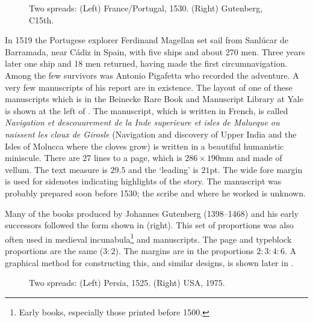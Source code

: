 \documentclass[10pt,letterpaper]{memoir}
\newlength{\pwlayi}\setlength{\pwlayi}{0.45\textwidth} %
\newlength{\pwlayii}\setlength{\pwlayii}{0.45\pwlayi}
\begin{document}
\begin{figure}
\centering
\begin{minipage}[b]{\pwlayi}
\end{minipage}
\hfill
\begin{minipage}[b]{\pwlayi}
\end{minipage}
\caption[Two spreads: France/Portugal, 1530 and Gutenberg, C15th]%
        {Two spreads: (Left) France/Portugal, 1530.
         (Right) Gutenberg, C15th.} \label{fb:9}
\end{figure}

    In 1519 the Portugese explorer Ferdinand Magellan set sail from 
Sanl\'{u}car de Barramada, near C\'{a}diz in Spain, 
with five ships and about 270 men.
Three years later one ship and 18 men returned, having made the first
circumnavigation. Among the few survivors was Antonio Pigafetta who recorded
the adventure. 
A very few manuscripts of his report are in existence.
The layout of one of these manuscripts which is in the Beinecke Rare
Book and Manuscript Library at Yale is shown at the left of .
The manuscript, which is written in French, is called 
\textit{Navigation et descouurement de la Inde superieure et isles
de Malueque ou naissent les cloux de Girosle} (Navigation and discovery
of Upper India and the Isles of Molucca where the cloves grow) is written
in a beautiful humanistic miniscule. There are 27 lines to a page, which
is $286 \times 190$mm and made of vellum. The text measure is $29.5$
and the `leading' is $21$pt. The wide fore margin is used for sidenotes
indicating highlights of the story. The manuscript was probably prepared 
soon before 1530; the scribe and where he worked is unknown.

    Many of the books produced by Johannes Gutenberg (1398--1468)
and his early successors 
followed the form shown in
 (right). This set of proportions was also often used in
medieval incunabula\footnote{Early books, especially those printed before
1500.}  and manuscripts. The page and typeblock proportions
are the same ($3 : 2$). The margins are in the proportions
$2 : 3 : 4 : 6$.
A graphical method for constructing this, and similar designs, is 
shown later in .

\begin{figure}
\centering
\begin{minipage}[b]{\pwlayi}
\end{minipage}
\hfill
\begin{minipage}[b]{\pwlayi}
\end{minipage}
\caption[Two spreads: Persia, 1525 and USA, 1975]%
        {Two spreads: (Left) Persia, 1525.
         (Right) USA, 1975.} \label{fb:10}
\end{figure}
\end{document}
